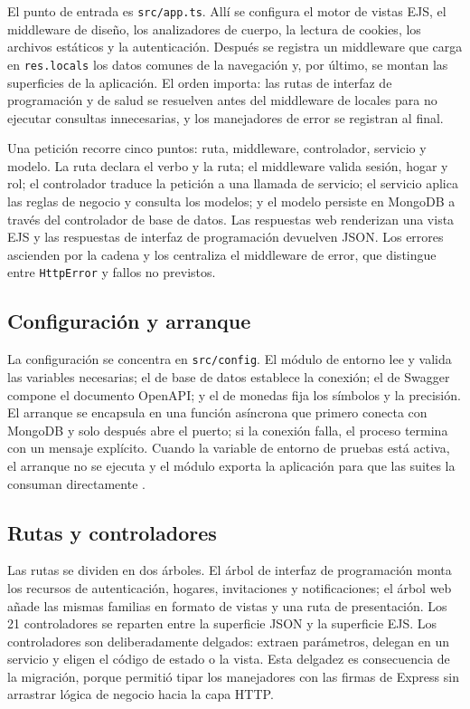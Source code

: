 \documentclass[conference]{IEEEtran}
\begin{document}
El punto de entrada es \texttt{src/app.ts}. Allí se configura el motor de
vistas EJS, el middleware de diseño, los analizadores de cuerpo, la lectura de
cookies, los archivos estáticos y la autenticación. Después se registra un
middleware que carga en \texttt{res.locals} los datos comunes de la navegación
y, por último, se montan las superficies de la aplicación. El orden importa:
las rutas de interfaz de programación y de salud se resuelven antes del
middleware de locales para no ejecutar consultas innecesarias, y los
manejadores de error se registran al final.

Una petición recorre cinco puntos: ruta, middleware, controlador, servicio y
modelo. La ruta declara el verbo y la ruta; el middleware valida sesión, hogar
y rol; el controlador traduce la petición a una llamada de servicio; el
servicio aplica las reglas de negocio y consulta los modelos; y el modelo
persiste en MongoDB a través del controlador de base de datos. Las respuestas
web renderizan una vista EJS y las respuestas de interfaz de programación
devuelven JSON. Los errores ascienden por la cadena y los centraliza el
middleware de error, que distingue entre \texttt{HttpError} y fallos no
previstos.

\subsection{Configuración y arranque}

La configuración se concentra en \texttt{src/config}. El módulo de entorno lee
y valida las variables necesarias; el de base de datos establece la conexión;
el de Swagger compone el documento OpenAPI; y el de monedas fija los símbolos y
la precisión. El arranque se encapsula en una función asíncrona que primero
conecta con MongoDB y solo después abre el puerto; si la conexión falla, el
proceso termina con un mensaje explícito. Cuando la variable de entorno de
pruebas está activa, el arranque no se ejecuta y el módulo exporta la
aplicación para que las suites la consuman directamente \cite{express}.

\subsection{Rutas y controladores}

Las rutas se dividen en dos árboles. El árbol de interfaz de programación monta
los recursos de autenticación, hogares, invitaciones y notificaciones; el árbol
web añade las mismas familias en formato de vistas y una ruta de presentación.
Los 21 controladores se reparten entre la superficie JSON y la superficie EJS.
Los controladores son deliberadamente delgados: extraen parámetros, delegan en
un servicio y eligen el código de estado o la vista. Esta delgadez es
consecuencia de la migración, porque permitió tipar los manejadores con las
firmas de Express sin arrastrar lógica de negocio hacia la capa HTTP.
\end{document}
